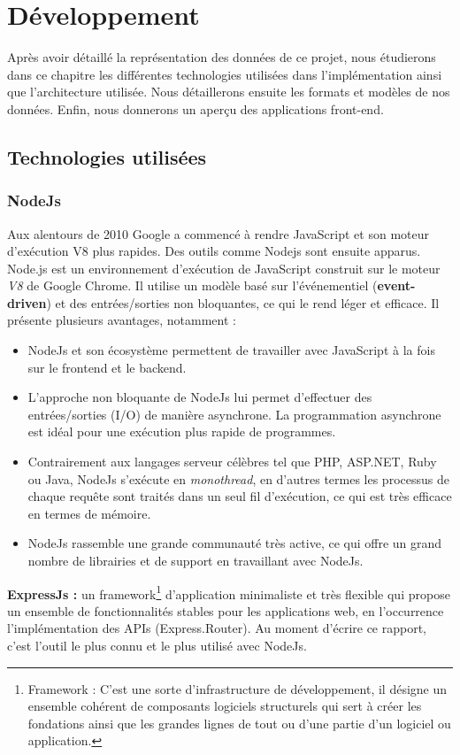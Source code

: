 \chapter{Développement}
Après avoir détaillé la représentation des données de ce projet, nous étudierons dans ce chapitre les différentes technologies utilisées dans l'implémentation ainsi que l'architecture utilisée. Nous détaillerons ensuite les formats et modèles de nos données. Enfin, nous donnerons un aperçu des applications front-end.
\section{Technologies utilisées}
\subsection{NodeJs}
Aux alentours de 2010 Google a commencé à rendre \Gls{JavaScript} et son moteur d'exécution V8 plus rapides. Des outils comme Nodejs sont ensuite apparus\cite{NodeJs}.\newline
Node.js est un environnement d'exécution de JavaScript construit sur le moteur \emph{V8} de Google Chrome. Il utilise un modèle basé sur l'événementiel (\textbf{event-driven}) et des entrées/sorties non bloquantes, ce qui le rend léger et efficace.
Il présente plusieurs avantages, notamment :
\begin{itemize}
	\item NodeJs et son écosystème permettent de travailler avec JavaScript à la fois sur le frontend et le backend.
	\item L'approche non bloquante de NodeJs lui permet d'effectuer des entrées/sorties (I/O) de manière asynchrone. La programmation asynchrone est idéal pour une exécution plus rapide de programmes.
	\item Contrairement aux langages serveur célèbres tel que PHP, ASP.NET, Ruby ou Java, NodeJs s'exécute en \emph{monothread}, en d'autres termes les processus de chaque requête sont traités dans un seul fil d'exécution, ce qui est très efficace en termes de mémoire.
	\item NodeJs rassemble une grande communauté très active, ce qui offre un grand nombre de librairies et de support en travaillant avec NodeJs.\newline
\end{itemize}

\textbf{ExpressJs :} un \gls{framework}\footnote{Framework : C'est une sorte d'infrastructure de développement, il désigne un ensemble cohérent de composants logiciels structurels qui sert à créer les fondations ainsi que les grandes lignes de tout ou d'une partie d'un logiciel ou application.} d'application minimaliste et très flexible qui propose un ensemble de fonctionnalités stables pour les applications web, en l'occurrence l'implémentation des APIs (Express.Router). Au moment d'écrire ce rapport, c'est l'outil le plus connu et le plus utilisé avec NodeJs.


